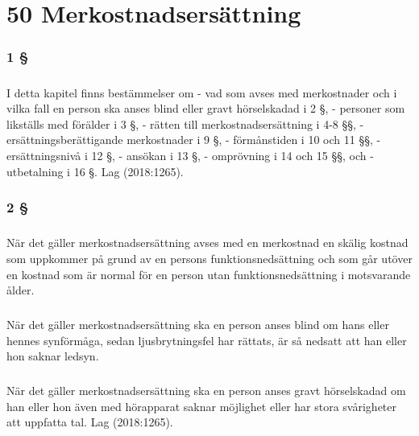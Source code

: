 \documentclass[a4paper,notitlepage,openany,10pt]{book}
\begin{document}
\chapter*{50 Merkostnadsersättning}
\subsection*{1 §}
\paragraph*{}
I detta kapitel finns bestämmelser om
\newline - vad som avses med merkostnader och i vilka fall en person ska anses blind eller gravt hörselskadad i 2 §,
\newline - personer som likställs med förälder i 3 §,
\newline - rätten till merkostnadsersättning i 4-8 §§,
\newline - ersättningsberättigande merkostnader i 9 §,
\newline - förmånstiden i 10 och 11 §§,
\newline - ersättningsnivå i 12 §,
\newline - ansökan i 13 §,
\newline - omprövning i 14 och 15 §§, och
\newline - utbetalning i 16 §.
Lag (2018:1265).
\subsection*{2 §}
\paragraph*{}
När det gäller merkostnadsersättning avses med en merkostnad en skälig kostnad som uppkommer på grund av en persons funktionsnedsättning och som går utöver en kostnad som är normal för en person utan funktionsnedsättning i motsvarande ålder.
\paragraph*{}
När det gäller merkostnadsersättning ska en person anses blind om hans eller hennes synförmåga, sedan ljusbrytningsfel har rättats, är så nedsatt att han eller hon saknar ledsyn.
\paragraph*{}
När det gäller merkostnadsersättning ska en person anses gravt hörselskadad om han eller hon även med hörapparat saknar möjlighet eller har stora svårigheter att uppfatta tal.
Lag (2018:1265).
\end{document}
